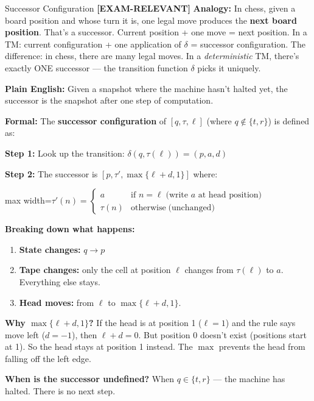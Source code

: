 \documentclass[11pt,a4paper]{article}
\newcommand{\fitmath}[1]{\begin{adjustbox}{max width=\linewidth}$\displaystyle #1$\end{adjustbox}}
\newcommand{\kemark}{\textcolor{red!70!black}{\textbf{[EXAM-RELEVANT]}}}
\begin{document}
\begin{definitionbox}{Successor Configuration \kemark}
\textbf{Analogy:} In chess, given a board position and whose turn it is, one legal move produces the \textbf{next board position}. That's a successor. Current position + one move = next position. In a TM: current configuration + one application of $\delta$ = successor configuration. The difference: in chess, there are many legal moves. In a \textit{deterministic} TM, there's exactly ONE successor --- the transition function $\delta$ picks it uniquely.

\textbf{Plain English:} Given a snapshot where the machine hasn't halted yet, the successor is the snapshot after one step of computation.

\textbf{Formal:} The \textbf{successor configuration} of $[q, \tau, \ell]$ (where $q \notin \{t, r\}$) is defined as:

\textbf{Step 1:} Look up the transition: $\delta(q, \tau(\ell)) = (p, a, d)$

\textbf{Step 2:} The successor is $[p, \tau', \max\{\ell + d, 1\}]$ where:
\fitmath{\tau'(n) = \begin{cases} a & \text{if } n = \ell \;\text{(write } a \text{ at head position)} \\ \tau(n) & \text{otherwise} \;\text{(unchanged)} \end{cases}}

\textbf{Breaking down what happens:}
\begin{enumerate}[nosep]
\item \textbf{State changes:} $q \to p$
\item \textbf{Tape changes:} only the cell at position $\ell$ changes from $\tau(\ell)$ to $a$. Everything else stays.
\item \textbf{Head moves:} from $\ell$ to $\max\{\ell + d, 1\}$.
\end{enumerate}

\textbf{Why $\max\{\ell + d, 1\}$?} If the head is at position 1 ($\ell = 1$) and the rule says move left ($d = -1$), then $\ell + d = 0$. But position 0 doesn't exist (positions start at 1). So the head stays at position 1 instead. The $\max$ prevents the head from falling off the left edge.

\textbf{When is the successor undefined?} When $q \in \{t, r\}$ --- the machine has halted. There is no next step.
\end{definitionbox}
\end{document}
